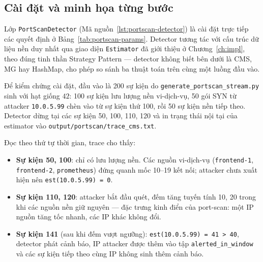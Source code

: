 \subsection{Cài đặt và minh họa từng bước}
\label{sec:portscan-impl}

Lớp \texttt{PortScanDetector} (Mã nguồn~\ref{lst:portscan-detector}) là cài đặt trực tiếp các quyết định ở Bảng~\ref{tab:portscan-params}. Detector tương tác với cấu trúc dữ liệu nền duy nhất qua giao diện \texttt{Estimator} đã giới thiệu ở Chương~\ref{ch:impl}, theo đúng tinh thần Strategy Pattern --- detector không biết bên dưới là CMS, MG hay HashMap, cho phép so sánh ba thuật toán trên cùng một luồng đầu vào.



Để kiểm chứng cài đặt, đầu vào là 200 sự kiện do \texttt{generate\_portscan\_stream.py} sinh với hạt giống $42$: 100 sự kiện lưu lượng nền vi-dịch-vụ, 50 gói SYN từ attacker \texttt{10.0.5.99} chèn vào từ sự kiện thứ 100, rồi 50 sự kiện nền tiếp theo. Detector dừng tại các sự kiện 50, 100, 110, 120 và in trạng thái nội tại của estimator vào \texttt{output/portscan/trace\_cms.txt}.



\noindent Đọc theo thứ tự thời gian, trace cho thấy:

\begin{itemize}
  \item \textbf{Sự kiện 50, 100}: chỉ có lưu lượng nền. Các nguồn vi-dịch-vụ (\texttt{frontend-1}, \texttt{frontend-2}, \texttt{prometheus}) đứng quanh mốc 10--19 kết nối; attacker chưa xuất hiện nên \texttt{est(10.0.5.99) = 0}.
  \item \textbf{Sự kiện 110, 120}: attacker bắt đầu quét, đếm tăng tuyến tính 10, 20 trong khi các nguồn nền giữ nguyên --- đặc trưng kinh điển của port-scan: một IP nguồn tăng tốc nhanh, các IP khác không đổi.
  \item \textbf{Sự kiện 141} (sau khi đếm vượt ngưỡng): \texttt{est(10.0.5.99) = 41 > 40}, detector phát cảnh báo, IP attacker được thêm vào tập \texttt{alerted\_in\_window} và các sự kiện tiếp theo cùng IP không sinh thêm cảnh báo.
\end{itemize}

